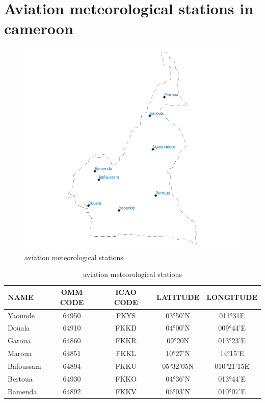 \section{Aviation meteorological stations in cameroon}
\begin{table}[H]
\caption{Aviation meteorological stations}
\begin{figure}[H]
\begin{center}
\includegraphics[scale=0.4]{cmr_station.png} %
\end{center}
\caption{aviation meteorological stations}
\label{aviation meteorological stations}%
\end{figure}
\label{tab:Aviation meteorological stations}
\begin{center}
\begin{tabular}{| l | c | c | c | c |}
\hline
\textbf{\small{NAME}} & \textbf{\small{OMM CODE}} & \textbf{\small{ICAO CODE}} & \textbf{\small{LATITUDE}} & \textbf{\small{LONGITUDE}}\\[2pt] \hline
\small{Yaounde}	& \small{64950}&	\small{FKYS}&	\small{03°50’N}&	\small{011°31E} \\\hline
\small{Douala}	& \small{64910}	& \small{FKKD}	& \small{04°00’N}& 	\small{009°44’E} \\\hline
\small{Garoua}	& \small{64860}& 	\small{FKKR}& 	\small{09°20N}& 	\small{013°23’E}\\\hline
\small{Maroua}	& \small{64851}	& \small{FKKL}& 	\small{10°27’N}	& \small{14°15’E}\\\hline
\small{Bafoussam}& 	\small{64894}& 	\small{FKKU}& 	\small{05°32’05N}& 	\small{010°21’15E}\\\hline
\small{Bertoua}& 	\small{64930}& 	\small{FKKO}& 	\small{04°36’N}& 	\small{013°44’E}\\\hline
\small{Bamenda}& 	\small{64892}& 	\small{FKKV}& 	\small{06°03’N}& 	\small{010°07’E}\\\hline
\end{tabular}
\end{center}
\end{table}
